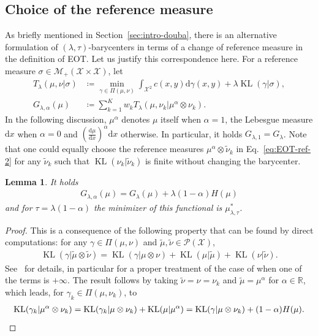 \documentclass[11pt]{article}
\newcommand{\rev}[1]{{#1}}
\newcommand{\RR}{\mathbb{R}}
\newcommand{\Mm}{\mathcal{M}}
\newcommand{\Pp}{\mathcal{P}}
\newcommand{\Xx}{\mathcal{X}}
\renewcommand{\d}{\mathrm{d}}
\DeclareMathOperator{\KL}{KL}
\newtheorem{lemma}[theorem]{Lemma}
\begin{document}
 \subsection{Choice of the reference measure}\label{sec:reference-measure}
 As briefly mentioned in Section~\ref{sec:intro-douba}, there is an alternative formulation of $(\lambda,\tau)$-barycenters in terms of a change of reference measure in the definition of EOT. Let us justify this correspondence here. For a reference measure $\sigma \in \Mm_+(\Xx\times \Xx)$, let 
 \begin{align}\label{eq:EOT-ref}
T_\lambda(\mu,\nu|\sigma)& \coloneqq \min_{\gamma \in \Pi(\mu,\nu)} \int_{\Xx^2} c(x,y) \d\gamma(x,y) + \lambda \KL(\gamma | \sigma),\\
G_{\lambda,\alpha} (\mu)&\coloneqq \sum_{k=1}^K w_k T_{\lambda}(\mu,\nu_k|\mu^\alpha\otimes \nu_k).\label{eq:EOT-ref-2}
\end{align}
In the following discussion, $\mu^\alpha$ denotes $\mu$ itself when $\alpha=1$, the Lebesgue measure $\d x$ when $\alpha=0$ and $(\frac{\d \mu}{\d x})^\alpha\d x$ otherwise. In particular, it holds $G_{\lambda,1}=G_\lambda$. Note that one could equally choose the reference measures $\mu^\alpha\otimes \tilde \nu_k$ in Eq.~\eqref{eq:EOT-ref-2} for any $\tilde \nu_k$ such that $\KL(\nu_k|\tilde \nu_k)$ is finite without changing the barycenter. 

\begin{lemma}\label{lem:change-ref}
It holds
\begin{align*}
G_{\lambda,\alpha}(\mu) = G_\lambda(\mu)+\lambda(1-\alpha)H(\mu)
\end{align*}
and for $\tau=\lambda(1-\alpha)$ the minimizer of this functional is $\mu^*_{\lambda,\tau}$.
\end{lemma}
\begin{proof}
This is a consequence of the following property that can be found by direct computations: \rev{for any $\gamma\in \Pi(\mu,\nu)$ and $\tilde \mu,\tilde \nu \in \Pp(\Xx)$,
\begin{align}\label{eq:change-ref-measure}
\KL(\gamma|\tilde \mu\otimes \tilde \nu) = \KL(\gamma| \mu\otimes \nu) +\KL(\mu|\tilde \mu) + \KL(\nu|\tilde \nu).
\end{align}
See~\cite[Lem.~1.6]{marino2020optimal} for details, in particular for a proper treatment of the case of when one of the terms is $+\infty$.}
The result follows by taking $\tilde \nu=\nu=\nu_k$ and $\tilde \mu = \mu^\alpha$ for $\alpha\in \RR$, which leads, for $\gamma_k\in \Pi(\mu,\nu_k)$, to
\begin{gather*}
\KL(\gamma_k|\mu^\alpha\otimes \nu_k) = \KL(\gamma_k|\mu\otimes \nu_k) +\KL(\mu|\mu^\alpha) = \KL(\gamma|\mu\otimes \nu_k) +(1-\alpha)H(\mu).
\qedhere
\end{gather*}
\end{proof}
\end{document}
